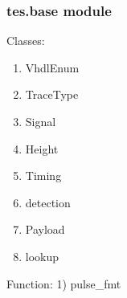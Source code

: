 \documentclass[letterpaper,10pt,english]{sphinxmanual}
\begin{document}
\subsubsection{tes.base module}
\label{\detokenize{tes:module-tes.base}}\label{\detokenize{tes:tes-base-module}}
\sphinxAtStartPar
Classes:
\begin{enumerate}
%
\item {} 
\sphinxAtStartPar
VhdlEnum

\item {} 
\sphinxAtStartPar
TraceType

\item {} 
\sphinxAtStartPar
Signal

\item {} 
\sphinxAtStartPar
Height

\item {} 
\sphinxAtStartPar
Timing

\item {} 
\sphinxAtStartPar
detection

\item {} 
\sphinxAtStartPar
Payload

\item {} 
\sphinxAtStartPar
lookup

\end{enumerate}

\sphinxAtStartPar
Function:
1) pulse\_fmt
\end{document}
